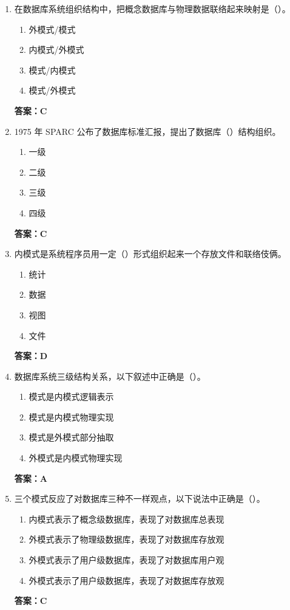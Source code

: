 \documentclass[12pt, a4paper]{article}
\begin{document}
\begin{enumerate}[label=\arabic*.]
    \item 在数据库系统组织结构中，把概念数据库与物理数据联络起来映射是（\quad）。
    \begin{enumerate}
        \item 外模式/模式
        \item 内模式/外模式
        \item 模式/内模式
        \item 模式/外模式
    \end{enumerate}
    \textbf{答案：C}

    \item 1975 年 SPARC 公布了数据库标准汇报，提出了数据库（\quad）结构组织。
    \begin{enumerate}
        \item 一级
        \item 二级
        \item 三级
        \item 四级
    \end{enumerate}
    \textbf{答案：C}

    \item 内模式是系统程序员用一定（\quad）形式组织起来一个存放文件和联络伎俩。
    \begin{enumerate}
        \item 统计
        \item 数据
        \item 视图
        \item 文件
    \end{enumerate}
    \textbf{答案：D}

    \item 数据库系统三级结构关系，以下叙述中正确是（\quad）。
    \begin{enumerate}
        \item 模式是内模式逻辑表示
        \item 模式是内模式物理实现
        \item 模式是外模式部分抽取
        \item 外模式是内模式物理实现
    \end{enumerate}
    \textbf{答案：A}

    \item 三个模式反应了对数据库三种不一样观点，以下说法中正确是（\quad）。
    \begin{enumerate}
        \item 内模式表示了概念级数据库，表现了对数据库总表现
        \item 外模式表示了物理级数据库，表现了对数据库存放观
        \item 外模式表示了用户级数据库，表现了对数据库用户观
        \item 外模式表示了用户级数据库，表现了对数据库存放观
    \end{enumerate}
    \textbf{答案：C}


\end{enumerate}
\end{document}
